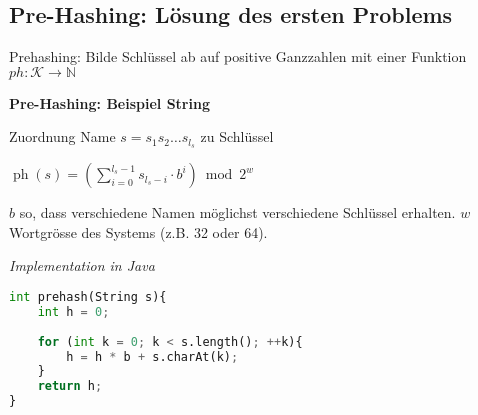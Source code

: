 \documentclass[german]{latex4ei/latex4ei_sheet}
\begin{document}
\begin{sectionbox}
\subsection{Pre-Hashing: Lösung des ersten Problems}\smallskip
Prehashing: Bilde Schlüssel ab auf positive Ganzzahlen mit einer Funktion $ph: \mathcal{K} \rightarrow \mathbb{N}$\par\smallskip
\textbf{Pre-Hashing: Beispiel String}\par
Zuordnung Name $s=s_{1} s_{2} \ldots s_{l_{s}}$ zu Schlüssel\par\smallskip
\begin{center}
    $\operatorname{ph}(s)=\left(\sum_{i=0}^{l_{s}-1} s_{l_{s}-i} \cdot b^{i}\right) \bmod 2^{w}$
\end{center}\par\smallskip
$b$ so, dass verschiedene Namen möglichst verschiedene Schlüssel erhalten.
$w$ Wortgrösse des Systems (z.B. 32 oder 64).\par\smallskip
\textit{Implementation in Java}\par
\begin{lstlisting}[language=Python]
int prehash(String s){
    int h = 0;
    
    for (int k = 0; k < s.length(); ++k){
        h = h * b + s.charAt(k);
    }
    return h;
}
\end{lstlisting}\vspace{-6px}
\end{sectionbox}
\end{document}
